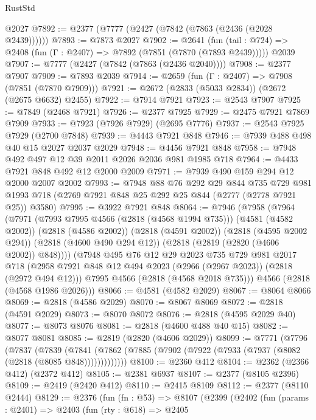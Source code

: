 \begin{lexlean}{RustStd}
\begin{coremodule}
    @2027
@7892 := @2377 (@7777 (@2427 (@7842 (@7863 (@2436 (@2028 @2439))))))
@7893 := @7873 @2027
@7902 := @2641
    (fun (tail : @724) => @2408 (fun (Γ : @2407) => @7892 (@7851 (@7870 (@7893 @2439)))))
    @2039
@7907 := @7777 (@2427 (@7842 (@7863 (@2436 @2040))))
@7908 := @2377 @7907
@7909 := @7893 @2039
@7914 := @2659 (fun (Γ : @2407) => @7908 (@7851 (@7870 @7909)))
@7921 := @2672 (@2833 (@5033 @2834)) (@2672 (@2675 @6632) @2455)
@7922 := @7914 @7921
@7923 := @2543 @7907
@7925 := @7849 (@2468 @7921)
@7926 := @2377 @7925
@7929 := @2475 @7921 @7869 @7909
@7933 := @7923 (@7926 @7929) (@2695 @7776)
@7937 := @2543 @7925 @7929 (@2700 @7848)
@7939 := @4443 @7921 @848
@7946 := @7939 @488 @498 @40 @15 @2027 @2037 @2029
@7948 := @4456 @7921 @848
@7958 := @7948 @492 @497 @12 @39 @2011 @2026 @2036 @981 @1985 @718
@7964 := @4433 @7921 @848 @492 @12 @2000 @2009
@7971 := @7939 @490 @159 @294 @12 @2000 @2007 @2002
@7993 := @7948
    @88
    @76
    @292
    @29
    @844
    @735
    @729
    @981
    @1993
    @718
    (@2769 @7921 @848 @25 @292 @25 @844 (@2777 (@2778 @7921 @25)) @3580)
@7995 := @3922 @7921 @848
@8064 := @7946
    (@7958
      (@7964
        (@7971
          (@7993 @7995 @4566 (@2818 (@4568 @1994 @735)))
          (@4581 (@4582 @2002))
          (@2818 (@4586 @2002))
          (@2818 (@4591 @2002))
          (@2818 (@4595 @2002 @294))
          (@2818 (@4600 @490 @294 @12))
          (@2818 (@2819 (@2820 (@4606 @2002)) @848))))
      (@7948
        @495
        @76
        @12
        @29
        @2023
        @735
        @729
        @981
        @2017
        @718
        (@2958 @7921 @848 @12 @494 @2023 (@2966 (@2967 @2023)) (@2818 (@2972 @494 @12)))
        @7995
        @4566
        (@2818 (@4568 @2018 @735)))
      @4566
      (@2818 (@4568 @1986 @2026)))
@8066 := @4581 (@4582 @2029)
@8067 := @8064 @8066
@8069 := @2818 (@4586 @2029)
@8070 := @8067 @8069
@8072 := @2818 (@4591 @2029)
@8073 := @8070 @8072
@8076 := @2818 (@4595 @2029 @40)
@8077 := @8073 @8076
@8081 := @2818 (@4600 @488 @40 @15)
@8082 := @8077 @8081
@8085 := @2819 (@2820 (@4606 @2029))
@8099 := @7771
    (@7796
      (@7837
        (@7839
          (@7841 (@7862 (@7885 (@7902 (@7922 (@7933 (@7937 (@8082 (@2818 (@8085 @848)))))))))))))
@8100 := @2360 @412
@8104 := @2362 (@2366 @412) (@2372 @412)
@8105 := @2381 @6937
@8107 := @2377 (@8105 @2396)
@8109 := @2419 (@2420 @412)
@8110 := @2415 @8109
@8112 := @2377 (@8110 @2444)
@8129 := @2376
    (fun (fn : @53) =>
    @8107
      (@2399
        (@2402
          (fun (params : @2401) =>
          @2403
            (fun (rty : @618) =>
            @2405

\end{coremodule}
\end{lexlean}
